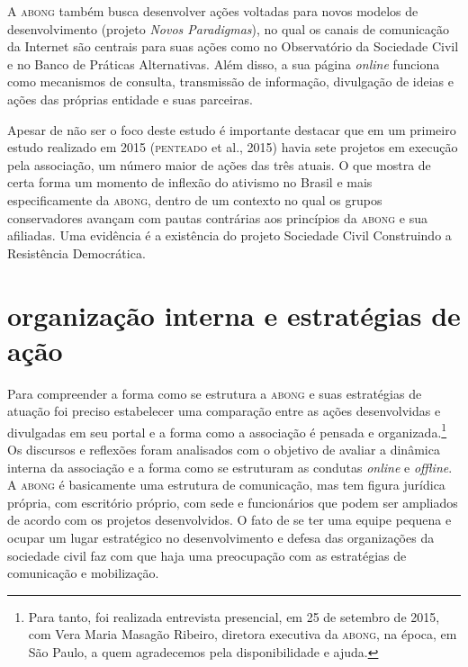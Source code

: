 A \textsc{abong} também busca desenvolver ações voltadas para novos modelos de
desenvolvimento (projeto \textit{Novos Paradigmas}), no qual os canais de
comunicação da Internet são centrais para suas ações como no
Observatório da Sociedade Civil e no Banco de Práticas Alternativas.
Além disso, a sua página \textit{online} funciona como mecanismos de consulta,
transmissão de informação, divulgação de ideias e ações das próprias
entidade e suas parceiras.

Apesar de não ser o foco deste estudo é importante destacar que em um
primeiro estudo realizado em 2015 (\textsc{penteado} et al., 2015) havia sete
projetos em execução pela associação, um número maior de ações das três
atuais. O que mostra de certa forma um momento de inflexão do ativismo
no Brasil e mais especificamente da \textsc{abong}, dentro de um contexto no qual
os grupos conservadores avançam com pautas contrárias aos princípios da
\textsc{abong} e sua afiliadas. Uma evidência é a existência do projeto Sociedade
Civil Construindo a Resistência Democrática.

\section{organização interna e estratégias de ação}

Para compreender a forma como se estrutura a \textsc{abong} e suas estratégias de
atuação foi preciso estabelecer uma comparação entre as ações
desenvolvidas e divulgadas em seu portal e a forma como a associação é
pensada e organizada.\footnote{Para tanto, foi realizada entrevista
  presencial, em 25 de setembro de 2015, com Vera Maria Masagão Ribeiro,
  diretora executiva da \textsc{abong}, na época, em São Paulo, a quem
  agradecemos pela disponibilidade e ajuda.} Os discursos e reflexões
foram analisados com o objetivo de avaliar a dinâmica interna da
associação e a forma como se estruturam as condutas \textit{online} e \textit{offline}.
A \textsc{abong} é basicamente uma estrutura de comunicação, mas tem figura
jurídica própria, com escritório próprio, com sede e funcionários que
podem ser ampliados de acordo com os projetos desenvolvidos. O fato de
se ter uma equipe pequena e ocupar um lugar estratégico no
desenvolvimento e defesa das organizações da sociedade civil faz com que
haja uma preocupação com as estratégias de comunicação e mobilização.

